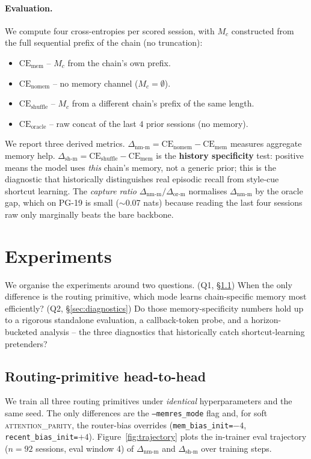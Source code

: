 \documentclass{article}
\newcommand{\dnm}{\Delta_{\text{nm-m}}}
\newcommand{\dsh}{\Delta_{\text{sh-m}}}
\newcommand{\dor}{\Delta_{\text{or-m}}}
\newcommand{\CEmem}{\mathrm{CE}_{\text{mem}}}
\newcommand{\CEnomem}{\mathrm{CE}_{\text{nomem}}}
\newcommand{\CEsh}{\mathrm{CE}_{\text{shuffle}}}
\newcommand{\CEor}{\mathrm{CE}_{\text{oracle}}}
\begin{document}
\paragraph{Evaluation.}
We compute four cross-entropies per scored session, with $M_c$
constructed from the full sequential prefix of the chain
(no truncation):
\begin{itemize}\setlength{\itemsep}{0pt}
\item $\CEmem$ -- $M_c$ from the chain's own prefix.
\item $\CEnomem$ -- no memory channel ($M_c = \emptyset$).
\item $\CEsh$ -- $M_c$ from a different chain's prefix of the same length.
\item $\CEor$ -- raw concat of the last $4$ prior sessions (no memory).
\end{itemize}
We report three derived metrics.
$\dnm = \CEnomem - \CEmem$ measures aggregate memory help.
$\dsh = \CEsh - \CEmem$ is the \textbf{history specificity} test:
positive means the model uses \emph{this} chain's memory, not a
generic prior; this is the diagnostic that historically distinguishes
real episodic recall from style-cue shortcut learning.
The \emph{capture ratio} $\dnm / \dor$ normalises $\dnm$ by the oracle
gap, which on PG-19 is small ($\sim$0.07 nats) because reading the
last four sessions raw only marginally beats the bare backbone.

\section{Experiments}
\label{sec:experiments}

We organise the experiments around two questions.
(Q1, \S\ref{sec:headtohead}) When the only difference is the routing
primitive, which mode learns chain-specific memory most efficiently?
(Q2, \S\ref{sec:diagnostics}) Do those memory-specificity numbers
hold up to a rigorous standalone evaluation, a callback-token probe,
and a horizon-bucketed analysis -- the three diagnostics that
historically catch shortcut-learning pretenders?

\subsection{Routing-primitive head-to-head}
\label{sec:headtohead}

We train all three routing primitives under \emph{identical}
hyperparameters and the same seed. The only differences are the
\texttt{--memres\_mode} flag and, for soft \textsc{attention\_parity},
the router-bias overrides (\texttt{mem\_bias\_init=}$-4$,
\texttt{recent\_bias\_init=}$+4$). Figure~\ref{fig:trajectory} plots
the in-trainer eval trajectory ($n = 92$ sessions, eval window 4) of
$\dnm$ and $\dsh$ over training steps.
\end{document}
